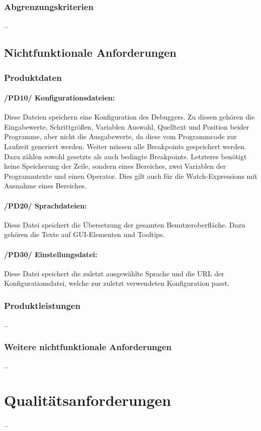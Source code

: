 \documentclass[parskip=full]{scrartcl}
\begin{document}
		\subsubsection{Abgrenzungskriterien}
		..
	\subsection{Nichtfunktionale Anforderungen}
		\subsubsection{Produktdaten}
			\paragraph{/PD10/ Konfigurationsdateien:}
			Diese Dateien speichern eine Konfiguration des Debuggers.
			Zu diesen gehören die Eingabewerte, Schrittgrößen, Variablen Auswahl, 						Quelltext und Position beider Programme, aber nicht die Ausgabewerte, da diese 			vom Programmcode zur Laufzeit generiert werden.
			Weiter müssen alle Breakpoints gespeichert werden. Dazu zählen sowohl gesetzte 			als auch bedingte Breakpoints. Letzteres benötigt keine Speicherung der Zeile, 			sondern eines Bereiches, zwei Variablen der Programmtexte und einen Operator. 				Dies gilt auch für die Watch-Expressions mit Ausnahme eines Bereiches.
			\paragraph{/PD20/ Sprachdateien:}
			Diese Datei speichert die Übersetzung der gesamten Benutzeroberfläche.
			Dazu gehören die Texte auf GUI-Elementen und Tooltips.
			\paragraph{/PD30/ Einstellungsdatei:}
			Diese Datei speichert die zuletzt ausgewählte Sprache und die URL der 						Konfigurationsdatei, welche zur zuletzt verwendeten Konfiguration passt.
		\subsubsection{Produktleistungen}
		..
		\subsubsection{Weitere nichtfunktionale Anforderungen}
		..

\section{Qualitätsanforderungen}
..
\end{document}
